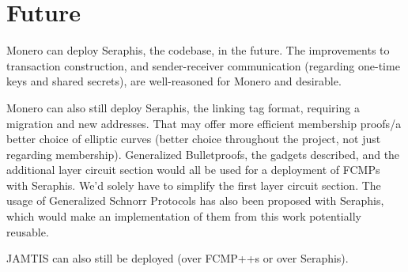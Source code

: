 \documentclass[]{article}
\begin{document}
\newpage

\section{Future}

Monero can deploy Seraphis, the codebase, in the future. The improvements to transaction construction, and sender-receiver communication (regarding one-time keys and shared secrets), are well-reasoned for Monero and desirable.

Monero can also still deploy Seraphis, the linking tag format, requiring a migration and new addresses. That may offer more efficient membership proofs/a better choice of elliptic curves (better choice throughout the project, not just regarding membership). Generalized Bulletproofs, the gadgets described, and the additional layer circuit section would all be used for a deployment of FCMPs with Seraphis. We'd solely have to simplify the first layer circuit section. The usage of Generalized Schnorr Protocols has also been proposed with Seraphis, which would make an implementation of them from this work potentially reusable.

JAMTIS can also still be deployed (over FCMP++s or over Seraphis).
\end{document}
